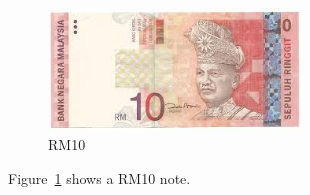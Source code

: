 \documentclass{article}
\begin{document}
    \begin{figure}[htbp]
        \centering
        \includegraphics[width=0.6\textwidth]{ten}
        \caption{RM10}
        \label{fig:car}
    \end{figure}
    
    Figure~{\ref{fig:car}} shows a RM10 note.
    
\end{document}
